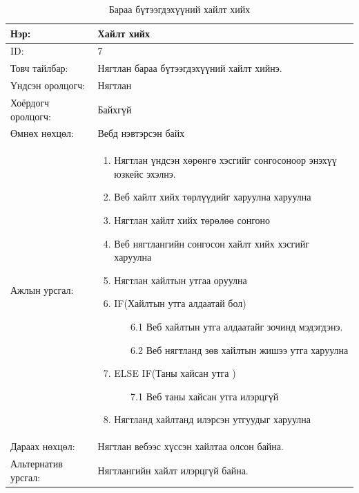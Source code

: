 \begin{center}
	\begin{table}[!htbp]
		\caption{Бараа бүтээгдэхүүний хайлт хийх} 
		\begin{tabular}{|p{4cm}|p{10cm}|}
			\hline
			Нэр: & Хайлт хийх  \\
			\hline
			ID: & 7 \\
			\hline
			Товч тайлбар: & Нягтлан бараа бүтээгдэхүүний хайлт хийнэ.  \\
			\hline
			Үндсэн оролцогч: & Нягтлан \\
			\hline
			Хоёрдогч оролцогч: & Байхгүй  \\
			\hline
			Өмнөх нөхцөл: &  Вебд нэвтэрсэн байх \\
			\hline
			Ажлын урсгал: & \begin{enumerate}
				\item Нягтлан үндсэн хөрөнгө хэсгийг  сонгосоноор энэхүү юзкейс эхэлнэ.
				\item Веб хайлт хийх төрлүүдийг харуулна харуулна
				\item Нягтлан хайлт хийх төрөлөө сонгоно
				\item Веб нягтлангийн сонгосон хайлт хийх хэсгийг харуулна
				\item Нягтлан хайлтын утгаа оруулна
				\item IF(Хайлтын утга алдаатай бол)
				\begin{enumerate}
					\item[6.1] Веб хайлтын утга алдаатайг зочинд мэдэгдэнэ.
					\item[6.2] Веб нягтланд зөв хайлтын жишээ утга харуулна
				\end{enumerate}	
				\item ELSE IF(Таны хайсан утга )
				\begin{enumerate}
					\item[7.1] Веб таны хайсан утга илэрцгүй 
				\end{enumerate}
				\item Нягтланд хайлтанд илэрсэн утгуудыг харуулна
			\end{enumerate} 	\\
			\hline
			Дараах нөхцөл: & Нягтлан вебээс хүссэн хайлтаа олсон байна. \\
			\hline
			Альтернатив урсгал: & Нягтлангийн хайлт илэрцгүй байна.\\
			\hline
		\end{tabular}
	\end{table}
\end{center}



